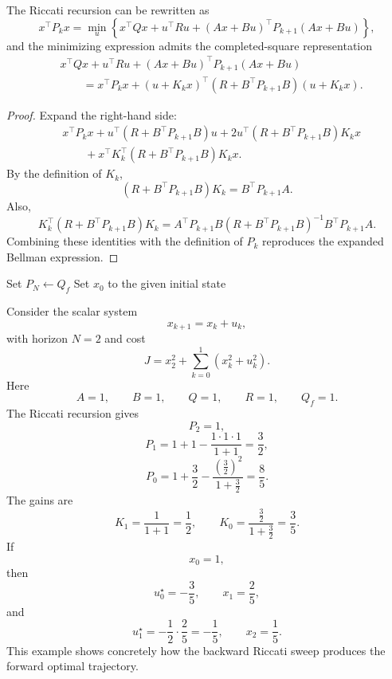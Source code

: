 \begin{proposition}\label{prop:l6-equivalent-completed-square-form}
	The Riccati recursion can be rewritten as
	\[
		x^\top P_k x
		=
		\min_u
		\left\{
		x^\top Qx + u^\top Ru + (Ax+Bu)^\top P_{k+1}(Ax+Bu)
		\right\},
	\]
	and the minimizing expression admits the completed-square representation
	\begin{align*}
		&x^\top Qx + u^\top Ru + (Ax+Bu)^\top P_{k+1}(Ax+Bu) \\
		&\qquad=
		x^\top P_k x
		+
		(u+K_kx)^\top (R+B^\top P_{k+1}B)(u+K_kx).
	\end{align*}
\end{proposition}
\begin{proof}
	Expand the right-hand side:
	\begin{align*}
		&x^\top P_k x + u^\top(R+B^\top P_{k+1}B)u + 2u^\top(R+B^\top P_{k+1}B)K_kx \\
		&\qquad + x^\top K_k^\top(R+B^\top P_{k+1}B)K_kx.
	\end{align*}
	By the definition of $K_k$,
	\[
		(R+B^\top P_{k+1}B)K_k = B^\top P_{k+1}A.
	\]
	Also,
	\[
		K_k^\top(R+B^\top P_{k+1}B)K_k
		=
		A^\top P_{k+1}B(R+B^\top P_{k+1}B)^{-1}B^\top P_{k+1}A.
	\]
	Combining these identities with the definition of $P_k$ reproduces the expanded Bellman expression.
\end{proof}

\begin{algorithm}[H]
	\DontPrintSemicolon
	\caption{Finite-Horizon Discrete-Time LQR}
\label{alg:l6-finite-horizon-discrete-time-lqr}
	Set $P_N \gets Q_f$\;
	Set $x_0$ to the given initial state\;
\end{algorithm}

\begin{eg}
	Consider the scalar system
	\[
		x_{k+1}=x_k+u_k,
	\]
	with horizon $N=2$ and cost
	\[
		J=x_2^2+\sum_{k=0}^{1}(x_k^2+u_k^2).
	\]
	Here
	\[
		A=1,
		\qquad
		B=1,
		\qquad
		Q=1,
		\qquad
		R=1,
		\qquad
		Q_f=1.
	\]
	The Riccati recursion gives
	\[
		P_2=1,
	\]
	\[
		P_1=1+1-\frac{1\cdot 1 \cdot 1}{1+1}=\frac{3}{2},
	\]
	\[
		P_0=1+\frac{3}{2}-\frac{(\frac{3}{2})^2}{1+\frac{3}{2}}=\frac{8}{5}.
	\]
	The gains are
	\[
		K_1=\frac{1}{1+1}=\frac{1}{2},
		\qquad
		K_0=\frac{\frac{3}{2}}{1+\frac{3}{2}}=\frac{3}{5}.
	\]
	If
	\[
		x_0=1,
	\]
	then
	\[
		u_0^\star=-\frac{3}{5},
		\qquad
		x_1=\frac{2}{5},
	\]
	and
	\[
		u_1^\star=-\frac{1}{2}\cdot \frac{2}{5}=-\frac{1}{5},
		\qquad
		x_2=\frac{1}{5}.
	\]
	This example shows concretely how the backward Riccati sweep produces the forward optimal trajectory.
\end{eg}


